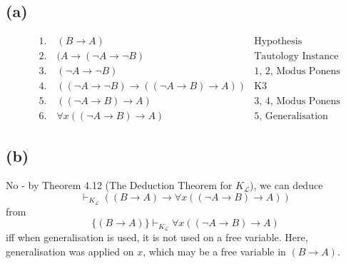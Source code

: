 \documentclass[11pt,oneside,a4paper]{article}
\begin{document}
\section{}
\subsection*{(a)}
\begin{align*}
&1. \quad (B \to A) \quad \quad \quad \quad \quad \quad &\text{Hypothesis}\\
&2. \quad (A \to (\neg A \to \neg B) &\text{Tautology Instance}\\
&3. \quad (\neg A \to \neg B) &\text{1, 2, Modus Ponens}\\
&4. \quad ((\neg A \to \neg B) \to (( \neg A \to B) \to A)) &\text{K3}\\
&5. \quad ((\neg A \to B) \to A) &\text{3, 4, Modus Ponens}\\
&6. \quad \forall x ((\neg A \to B) \to A) &\text{5, Generalisation}
\end{align*}

\subsection*{(b)}
No - by Theorem 4.12 (The Deduction Theorem for $K_\mathcal{L}$), we can deduce $$\vdash_{K_\mathcal{L}} ((B \to A) \to \forall x ((\neg A \to B) \to A))$$ from $$\{ (B \to A) \} \vdash_{K_\mathcal{L}} \forall x ((\neg A \to B) \to A)$$ iff when generalisation is used, it is not used on a free variable. Here, generalisation was applied on $x$, which may be a free variable in $(B \to A)$.
\end{document}
